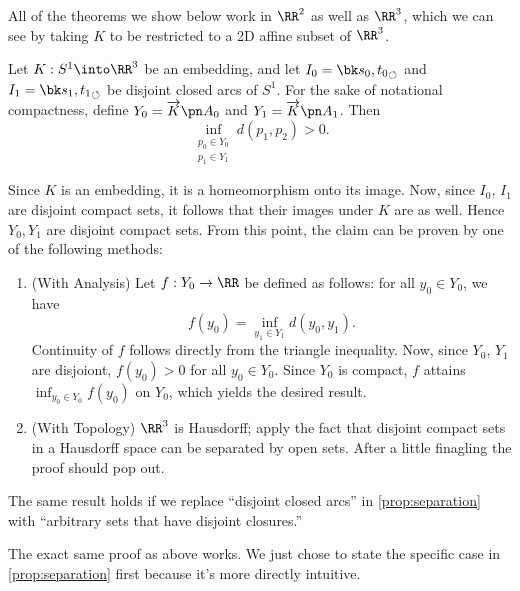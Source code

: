 All of the theorems we show below work in $\RR^2$ as well as $\RR^3$,
which we can see by taking $K$ to be restricted to a 2D affine subset
of $\RR^3$.
\begin{proposition}\label{prop:separation}
  Let $K : S^1 \into \RR^3$ be an embedding, and let $I_0 = \sbk{s_0,
    t_0}$ and $I_1 = \sbk{s_1, t_1}$ be disjoint closed arcs of $S^1$.
  For the sake of notational compactness, define $Y_0 = \fim{K}{A_0}$
  and $Y_1 = \fim{K}{A_1}$. Then
  \[
    \inf_{\substack{p_0 \in Y_0 \\ p_1 \in Y_1}} d(p_1, p_2) > 0.
  \]
\end{proposition}
\begin{sproof}
  Since $K$ is an embedding, it is a homeomorphism onto its image.
  Now, since $I_0$, $I_1$ are disjoint compact sets, it follows that
  their images under $K$ are as well. Hence $Y_0, Y_1$ are disjoint
  compact sets. From this point, the claim can be proven by one of the
  following methods:
  \begin{enumerate}
    \item (With Analysis) Let $f : Y_0 \to \RR$ be defined as follows:
      for all $y_0 \in Y_0$, we have
      \[
      f(y_0) = \inf_{y_1 \in Y_1} d(y_0, y_1).
      \]
      Continuity of $f$ follows directly from the triangle inequality.
      Now, since $Y_0$, $Y_1$ are disjoiont, $f(y_0) > 0$ for all
      $y_0 \in Y_0$. Since $Y_0$ is compact, $f$ attains $\inf_{y_0
      \in Y_0} f(y_0)$ on $Y_0$, which yields the desired result.
    \item (With Topology) $\RR^3$ is Hausdorff; apply the fact that
      disjoint compact sets in a Hausdorff space can be separated by
      open sets. After a little finagling the proof should pop out.
      \qedhere
  \end{enumerate}
\end{sproof}
\begin{corollary}\label{cor:works-for-open}
  The same result holds if we replace ``disjoint closed arcs'' in
  \cref{prop:separation} with ``arbitrary sets that have disjoint
  closures.''
\end{corollary}
\begin{sproof}
  The exact same proof as above works. We just chose to state the
  specific case in \cref{prop:separation} first because it's more
  directly intuitive.
\end{sproof}

